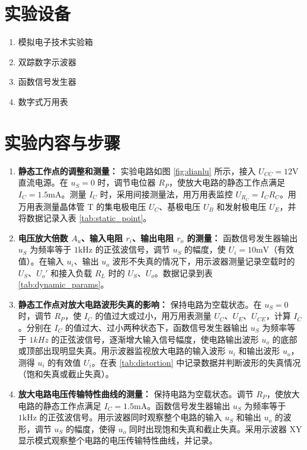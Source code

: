 ﻿\documentclass[10.5pt]{config}
\begin{document}
\section{实验设备}
\begin{enumerate}[label=\arabic*., leftmargin=2em]
    \item 模拟电子技术实验箱
    \item 双踪数字示波器
    \item 函数信号发生器
    \item 数字式万用表
\end{enumerate}


\section{实验内容与步骤}

\begin{enumerate}[label=\arabic*., leftmargin=2em]
    \item \textbf{静态工作点的调整和测量：} 
    实验电路如图 \ref{fig:dianlu} 所示，接入 $U_{CC} = 12\mathrm{V}$ 直流电源。在 $u_S = 0$ 时，调节电位器 $R_P$，使放大电路的静态工作点满足 $I_C = 1.5\mathrm{mA}$。测量 $I_C$ 时，采用间接测量法，用万用表监控 $U_{R_C} = I_C R_C$。用万用表测量晶体管 T 的集电极电压 $U_C$、基极电压 $U_B$ 和发射极电压 $U_E$，并将数据记录入表 \ref{tab:static_point}。
    
    \item \textbf{电压放大倍数 $A_u$、输入电阻 $r_i$、输出电阻 $r_o$ 的测量：} 
    函数信号发生器输出 $u_S$ 为频率等于 $1\mathrm{kHz}$ 的正弦波信号，调节 $u_S$ 的幅度，使 $U_i = 10\mathrm{mV}$（有效值）。在输入 $u_i$、输出 $u_o$ 波形不失真的情况下，用示波器测量记录空载时的 $U_S$、$U_o'$ 和接入负载 $R_L$ 时的 $U_S$、$U_o$。数据记录到表 \ref{tab:dynamic_params}。

    \item \textbf{静态工作点对放大电路波形失真的影响：}
    保持电路为空载状态。在 $u_S = 0$ 时，调节 $R_P$，使 $I_C$ 的值过大或过小，用万用表测量 $U_C$、$U_E$、$U_{CE}$，计算 $I_C$。分别在 $I_C$ 的值过大、过小两种状态下，函数信号发生器输出 $u_S$ 为频率等于 $1kHz$ 的正弦波信号，逐渐增大输入信号幅度，使电路输出波形 $u_o$ 的底部或顶部出现明显失真。用示波器监视放大电路的输入波形 $u_i$ 和输出波形 $u_o$，测得 $u_i$ 的有效值 $U_i$。在表 \ref{tab:distortion} 中记录数据并判断波形的失真情况（饱和失真或截止失真）。
    
    \item \textbf{放大电路电压传输特性曲线的测量：}
    保持电路为空载状态。调节 $R_P$，使放大电路的静态工作点满足 $I_C = 1.5\mathrm{mA}$。函数信号发生器输出 $u_S$ 为频率等于 $1\mathrm{kHz}$ 的正弦波信号。用示波器同时观察整个电路的输入 $u_S$ 和输出 $u_o$ 的波形，调节 $u_S$ 的幅度，使得 $u_o$ 同时出现饱和失真和截止失真。采用示波器 XY 显示模式观察整个电路的电压传输特性曲线，并记录。
\end{enumerate}
\end{document}
